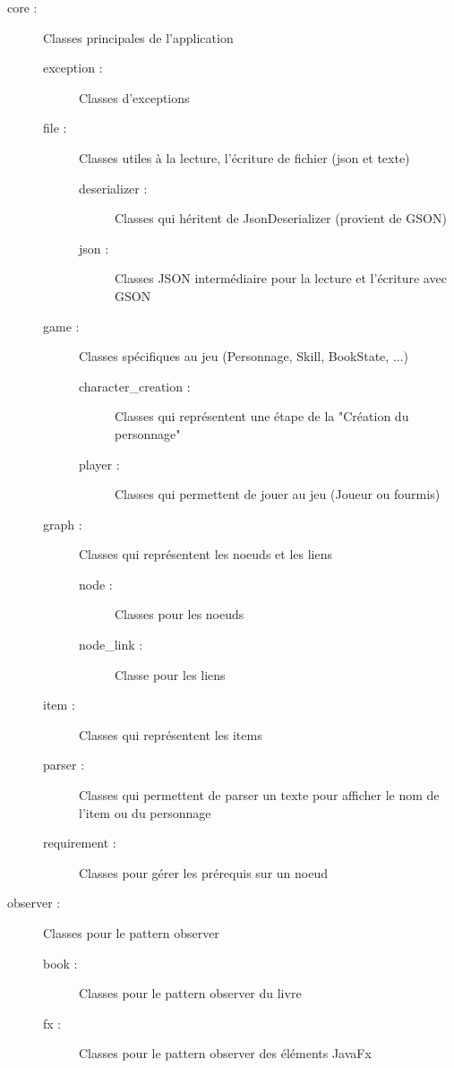 		\begin{description}
			\item[core :]{Classes principales de l'application}
			\begin{description}
				\item[exception :]{Classes d'exceptions}
				\item[file :]{Classes utiles à la lecture, l'écriture de fichier (json et texte)}
				\begin{description}
					\item[deserializer :]{Classes qui héritent de JsonDeserializer (provient de GSON)}
					\item[json :]{Classes JSON intermédiaire pour la lecture et l'écriture avec GSON}
				\end{description}
				\item[game :]{Classes spécifiques au jeu (Personnage, Skill, BookState, ...)}
				\begin{description}
					\item[character\_creation :]{Classes qui représentent une étape de la "Création du personnage"}
					\item[player :]{Classes qui permettent de jouer au jeu (Joueur ou fourmis)}
				\end{description}
				\item[graph :]{Classes qui représentent les noeuds et les liens}
				\begin{description}
					\item[node :]{Classes pour les noeuds}
					\item[node\_link :]{Classe pour les liens}
				\end{description}
				\item[item :]{Classes qui représentent les items}
				\item[parser :]{Classes qui permettent de parser un texte pour afficher le nom de l'item ou du personnage}
				\item[requirement :]{Classes pour gérer les prérequis sur un noeud}
			\end{description}

			\item[observer :]{Classes pour le pattern observer}
			\begin{description}
				\item[book :]{Classes pour le pattern observer du livre}
				\item[fx :]{Classes pour le pattern observer des éléments JavaFx}
			\end{description}


\end{description}
